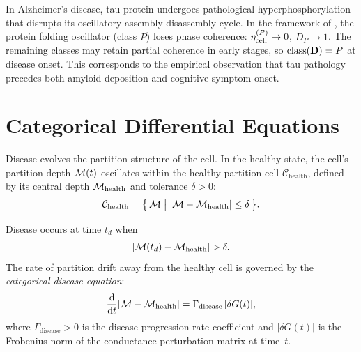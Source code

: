 \begin{example}
In Alzheimer's disease, tau protein undergoes pathological
hyperphosphorylation that disrupts its oscillatory assembly-disassembly
cycle.  In the framework of , the protein
folding oscillator (class $P$) loses phase coherence: $\eta_{\mathrm{cell}}^{(P)} \to 0$,
$D_P \to 1$.  The remaining classes may retain partial coherence in early
stages, so $\mathrm{class}(\mathbf{D}) = P$ at disease onset.  This corresponds
to the empirical observation that tau pathology precedes both amyloid
deposition and cognitive symptom onset.
\end{example}

\section{Categorical Differential Equations}
\label{sec:categorical-diff-eqs}

Disease evolves the partition structure of the cell.  In the healthy state,
the cell's partition depth $\mathcal{M}(t)$ oscillates within the healthy
partition cell $\mathcal{C}_{\mathrm{health}}$, defined by its central depth
$\mathcal{M}_{\mathrm{health}}$ and tolerance $\delta > 0$:
\begin{equation}
  \mathcal{C}_{\mathrm{health}}
  = \bigl\{\,\mathcal{M} \;\big|\; |\mathcal{M} - \mathcal{M}_{\mathrm{health}}| \leq \delta\,\bigr\}.
  \label{eq:health-cell}
\end{equation}

\begin{definition}
\label{def:categorical-disease}
Disease occurs at time $t_d$ when
\begin{equation}
  |\mathcal{M}(t_d) - \mathcal{M}_{\mathrm{health}}| > \delta.
  \label{eq:disease-criterion}
\end{equation}
The rate of partition drift away from the healthy cell is governed by the
\emph{categorical disease equation}:
\begin{equation}
  \frac{\dd}{\dd t}|\mathcal{M} - \mathcal{M}_{\mathrm{health}}|
  = \Gamma_{\mathrm{disease}}\,|\delta G(t)|,
  \label{eq:categorical-disease-eq}
\end{equation}
where $\Gamma_{\mathrm{disease}} > 0$ is the disease progression rate
coefficient and $|\delta G(t)|$ is the Frobenius norm of the conductance
perturbation matrix at time~$t$.
\end{definition}

